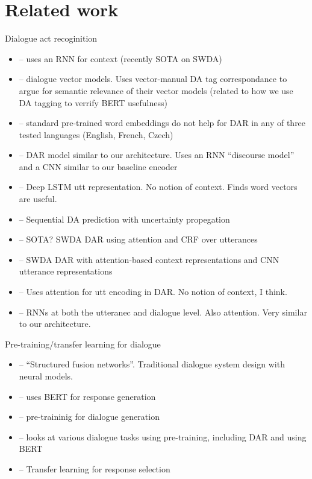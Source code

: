 \documentclass[11pt,a4paper]{article}
\begin{document}
\section{Related work} %
Dialogue act recoginition
\begin{itemize}
  \item \citet{botheContextbasedApproachDialogue2018} -- uses an RNN for context (recently SOTA on SWDA)
  \item \citet{pragstVectorRepresentationUtterances2018} -- dialogue vector models. Uses vector-manual DA tag correspondance to argue for semantic relevance of their vector models (related to how we use DA tagging to verrify BERT usefulness)
  \item \citet{cerisaraEffectsUsingWord2vec2017} -- standard pre-trained word embeddings do not help for DAR in any of three tested languages (English, French, Czech)
  \item \citet{kalchbrennerRecurrentConvolutionalNeural2013} -- DAR model similar to our architecture. Uses an RNN ``discourse model'' and a CNN similar to our baseline encoder
  \item \citet{khanpourDialogueActClassification2016} -- Deep LSTM utt representation. No notion of context. Finds word vectors are useful.
  \item \citet{tranPreservingDistributionalInformation2017} -- Sequential DA prediction with uncertainty propegation
  \item \citet{chenDialogueActRecognition2017} -- SOTA? SWDA DAR using attention and CRF over utterances
  \item \citet{ortegaNeuralbasedContextRepresentation2017} -- SWDA DAR with attention-based context representations and CNN utterance representations
  \item \citet{shenNeuralAttentionModels2016} -- Uses attention for utt encoding in DAR. No notion of context, I think.
  \item \citet{tranHierarchicalNeuralModel2017} -- RNNs at both the utteranec and dialogue level. Also attention. Very similar to our architecture.
\end{itemize}

Pre-training/transfer learning for dialogue
\begin{itemize}
  \item \citet{mehriStructuredFusionNetworks2019} -- ``Structured fusion networks''. Traditional dialogue system design with neural models.
  \item \citet{chenSemanticallyConditionedDialog2019a} -- uses BERT for response generation
  \item \citet{baoPLATOPretrainedDialogue2019} -- pre-traininig for dialogue generation
  \item \citet{mehriPretrainingMethodsDialog2019} -- looks at various dialogue tasks using pre-training, including DAR and using BERT
  \item \citet{vigComparisonTransferLearningApproaches} -- Transfer learning for response selection
\end{itemize}
\end{document}
